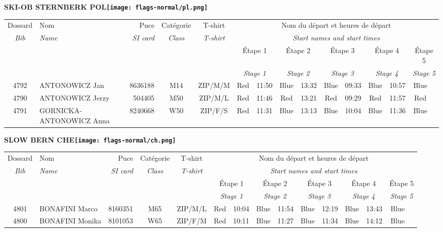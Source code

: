 \documentclass{report}
\begin{document}
\newpage
  \Huge \centering \bfseries SKI-OB STERNBERK  POL\normalfont \footnotesize \sffamily \hfill \texttt{[image: flags-normal/pl.png]} \newline 
  \begin{longtable}{|c|l|r|c|c|*{5}{cc|}}
    Dossard & Nom  & Puce    & Catégorie & T-shirt & \multicolumn{10}{c|}{Nom du départ et heures de départ} \\
    \itshape Bib     & \itshape Name & \itshape SI card & \itshape Class  & \itshape  T-shirt  & \multicolumn{10}{c|}{\itshape Start names and start times} \\
    \hline
    & & & & & \multicolumn{2}{c|}{Étape 1} & \multicolumn{2}{c|}{Étape 2} & \multicolumn{2}{c|}{Étape 3} & \multicolumn{2}{c|}{Étape 4} & \multicolumn{2}{c|}{Étape 5} \\
    & & & & & \multicolumn{2}{c|}{\itshape Stage 1} & \multicolumn{2}{c|}{\itshape Stage 2} & \multicolumn{2}{c|}{\itshape Stage 3} & \multicolumn{2}{c|}{\itshape Stage 4} & \multicolumn{2}{c|}{\itshape Stage 5} \\
    \hline
    4792 & ANTONOWICZ Jan & 8636188 & M14 & ZIP/M/M & Red & 11:50 & Blue & 13:32 & Blue & 09:33 & Blue & 10:57 & Blue &  \\
    4790 & ANTONOWICZ Jerzy & 504405 & M50 & ZIP/M/L & Red & 11:46 & Red & 13:21 & Red & 09:29 & Red & 11:57 & Red &  \\
    4791 & GORNICKA-ANTONOWICZ Anna & 8240668 & W50 & ZIP/F/S & Red & 11:31 & Blue & 13:13 & Blue & 10:04 & Blue & 11:36 & Blue &  \\
  \end{longtable}
\newpage
  \Huge \centering \bfseries SLOW BERN  CHE\normalfont \footnotesize \sffamily \hfill \texttt{[image: flags-normal/ch.png]} \newline 
  \begin{longtable}{|c|l|r|c|c|*{5}{cc|}}
    Dossard & Nom  & Puce    & Catégorie & T-shirt & \multicolumn{10}{c|}{Nom du départ et heures de départ} \\
    \itshape Bib     & \itshape Name & \itshape SI card & \itshape Class  & \itshape  T-shirt  & \multicolumn{10}{c|}{\itshape Start names and start times} \\
    \hline
    & & & & & \multicolumn{2}{c|}{Étape 1} & \multicolumn{2}{c|}{Étape 2} & \multicolumn{2}{c|}{Étape 3} & \multicolumn{2}{c|}{Étape 4} & \multicolumn{2}{c|}{Étape 5} \\
    & & & & & \multicolumn{2}{c|}{\itshape Stage 1} & \multicolumn{2}{c|}{\itshape Stage 2} & \multicolumn{2}{c|}{\itshape Stage 3} & \multicolumn{2}{c|}{\itshape Stage 4} & \multicolumn{2}{c|}{\itshape Stage 5} \\
    \hline
    4801 & BONAFINI Marco & 8160351 & M65 & ZIP/M/L & Red & 10:04 & Blue & 11:54 & Blue & 12:19 & Blue & 13:43 & Blue &  \\
    4800 & BONAFINI Monika & 8101053 & W65 & ZIP/F/M & Red & 10:11 & Blue & 11:27 & Blue & 11:34 & Blue & 14:12 & Blue &  \\
  \end{longtable}
\end{document}
